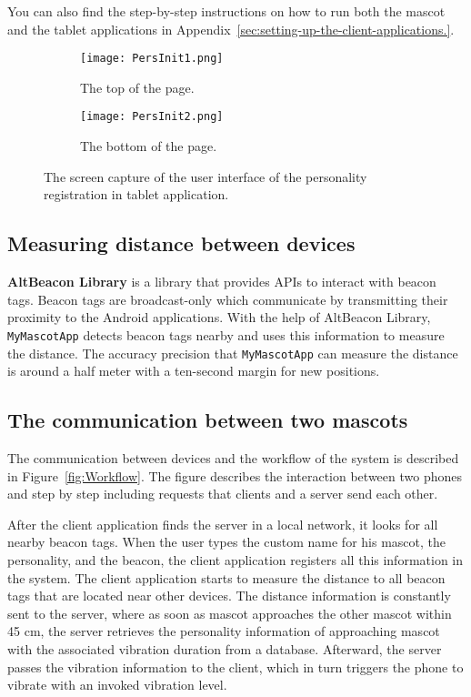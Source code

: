 You can also find the step-by-step instructions on how to run both the mascot and the tablet applications in
Appendix~\ref{sec:setting-up-the-client-applications.}.

\begin{figure}[hbt!]
    \centering
    \begin{subfigure}{.40\textwidth}
        \centering
        \texttt{[image: PersInit1.png]}
        \caption{The top of the page.}
        \label{fig:sub1}
    \end{subfigure}\hfill%
    \begin{subfigure}{.40\textwidth}
        \centering
        \texttt{[image: PersInit2.png]}
        \caption{The bottom of the page.}
        \label{fig:sub2}
    \end{subfigure}\hfill
    \caption{The screen capture of the user interface of the personality registration in tablet application.}
    \label{fig:PersInit}
\end{figure}

\subsection{Measuring distance between devices}
\label{subsec:measuring-distance-between-devices.}
\textbf{AltBeacon Library} is a library that provides APIs to interact with beacon tags.
Beacon tags are broadcast-only which communicate by transmitting their proximity to the Android applications.
With the help of AltBeacon Library, \texttt{MyMascotApp} detects beacon tags nearby
and uses this information to measure the distance.
The accuracy precision that \texttt{MyMascotApp} can measure the distance is around a half meter
with a ten-second margin for new positions.

\subsection{The communication between two mascots}
\label{subsec:the-communication-between-two-mascots.}
The communication between devices and the workflow of the system is described in Figure~\ref{fig:Workflow}.
The figure describes the interaction between two phones and step by step including requests
that clients and a server send each other.

After the client application finds the server in a local network, it looks for all nearby beacon tags.
When the user types the custom name for his mascot, the personality, and the beacon, the client
application registers all this information in the system.
The client application starts to measure the distance to all beacon tags that are located near other devices.
The distance information is constantly sent to the server, where as soon as mascot approaches the other mascot within
45 cm, the server retrieves the personality information of approaching mascot with the associated vibration duration
from a database.
Afterward, the server passes the vibration information to the client, which in turn triggers the
phone to vibrate with an invoked vibration level.

